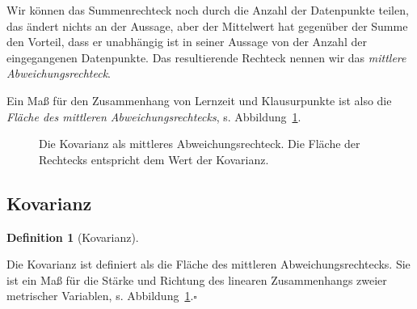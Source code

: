 \documentclass[
  a4paper,
]{scrbook}
\theoremstyle{definition}
\theoremstyle{definition}
\newtheorem{definition}{Definition}[chapter]
\theoremstyle{definition}
\theoremstyle{remark}
\begin{document}
Wir können das Summenrechteck noch durch die Anzahl der Datenpunkte
teilen, das ändert nichts an der Aussage, aber der Mittelwert hat
gegenüber der Summe den Vorteil, dass er unabhängig ist in seiner
Aussage von der Anzahl der eingegangenen Datenpunkte. Das resultierende
Rechteck nennen wir das \emph{mittlere Abweichungsrechteck}.

Ein Maß für den Zusammenhang von Lernzeit und Klausurpunkte ist also die
\emph{Fläche des mittleren Abweichungsrechtecks}, s.
Abbildung~\ref{fig-cov2}.

\begin{figure}


\caption{\label{fig-cov2}Die Kovarianz als mittleres
Abweichungsrechteck. Die Fläche der Rechtecks entspricht dem Wert der
Kovarianz.}

\end{figure}%

\subsection{Kovarianz}\label{sec-kov}

\begin{definition}[Kovarianz]\protect\hypertarget{def-kov}{}\label{def-kov}

Die Kovarianz ist definiert als die Fläche des mittleren
Abweichungsrechtecks. Sie ist ein Maß für die Stärke und Richtung des
linearen Zusammenhangs zweier metrischer Variablen, s.
Abbildung~\ref{fig-cov2}.\(\square\)

\end{definition}
\end{document}
